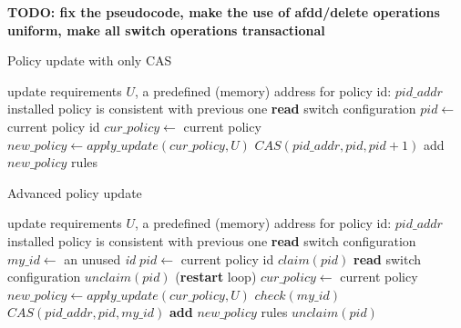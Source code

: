 \documentclass[conference]{sigcomm-alternate}
\newcommand{\claimcheck}{check\xspace}
\begin{document}
\textbf{TODO: fix the pseudocode, make the use of afdd/delete
  operations uniform, make all switch operations transactional}



\begin{algorithm}[t]
    \caption{Policy update with only CAS}
    \label{alg:simple-update}
    \begin{algorithmic}[1]
    \Require update requirements $U$, a predefined (memory) address for  policy id: $pid\_addr$
    \Ensure installed policy is consistent with previous one
 		\Repeat
 			\State \textbf{read} switch configuration
 			\State $pid\gets$ current policy id
 			\State $cur\_policy\gets$ current policy
 			\State $new\_policy\gets apply\_update(cur\_policy,U)$
 			\startTxn
	 			\State $CAS(pid\_addr,pid,pid+1)$
	 			\State add $new\_policy$ rules %
 			\endTxn
			\Return

    \end{algorithmic}
\end{algorithm}



\begin{algorithm}[t]
    \caption{Advanced policy update}
    \label{alg:update}
    \begin{algorithmic}[1]
    \Require update requirements $U$, a predefined (memory) address for  policy id: $pid\_addr$
    \Ensure installed policy is consistent with previous one
 		\Repeat
 			\State \textbf{read} switch configuration
 			\State $my\_id\gets$ an unused \emph{id}
 			\State $pid\gets$ current policy id
 			\State $claim(pid)$
 			\State \textbf{read} switch configuration
	 			\State $unclaim(pid)$
 				 (\textbf{restart} loop)
 			\EndIf
 			\State $cur\_policy\gets$ current policy
 			\State $new\_policy\gets apply\_update(cur\_policy,U)$
 			\startTxn
 				\State $\claimcheck(my\_id)$
	 			\State $CAS(pid\_addr, pid,my\_id)$
	 			\State \textbf{add} $new\_policy$ rules %
 			\endTxn
	 		\State $unclaim(pid)$
			\Return

    \end{algorithmic}
\end{algorithm}
\end{document}

